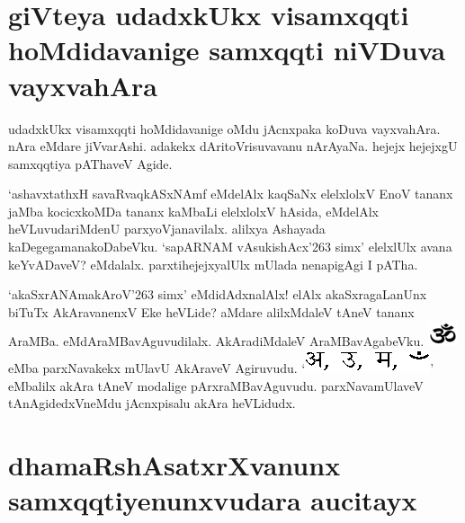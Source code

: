 \section*{giVteya udadxkUkx visamxqqti hoMdidavanige samxqqti niVDuva vayxvahAra}

udadxkUkx visamxqqti hoMdidavanige oMdu jAcnxpaka koDuva vayxvahAra. nAra eMdare jiVvarAshi. adakekx dAritoVrisuvavanu nArAyaNa. hejejx hejejxgU samxqqtiya pAThaveV Agide.

`ashavxtathxH savaRvaqkASxNAmf\label{93d} eMdelAlx kaqSaNx elelxlolxV EnoV tananx jaMba kocicxkoMDa tananx kaMbaLi elelxlolxV hAsida, eMdelAlx heVLuvudariMdenU parxyoVjanavilalx. alilxya Ashayada kaDegegamanakoDabeVku. `sapARNAM vAsukishAcx\char'263 simx'\label{93b} elelxlUlx avana keYvADaveV? eMdalalx. parxtihejejxyalUlx mUlada nenapigAgi I pATha. 

`akaSxrANAmakAroV\char'263 simx'\label{93c} eMdidAdxnalAlx! elAlx akaSxragaLanUnx biTuTx AkAravanenxV Eke heVLide? aMdare alilxMdaleV tAneV tananx AraMBa. {} eMdAraMBavAguvudilalx. AkAradiMdaleV AraMBavAgabeVku. \includegraphics{Om-PNG.eps} eMba parxNavakekx mUlavU AkAraveV Agiruvudu. `\includegraphics{symbol.eps}' eMbalilx akAra tAneV modalige pArxraMBavAguvudu. parxNavamUlaveV tAnAgidedxVneMdu jAcnxpisalu akAra heVLidudx. 

\section*{dhamaRshAsatxrXvanunx samxqqtiyenunxvudara aucitayx}

